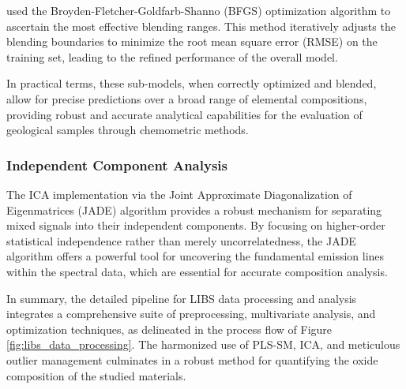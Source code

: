 \citet{andersonImprovedAccuracyQuantitative2017} used the Broyden-Fletcher-Goldfarb-Shanno (BFGS) optimization algorithm to ascertain the most effective blending ranges. This method iteratively adjusts the blending boundaries to minimize the root mean square error (RMSE) on the training set, leading to the refined performance of the overall model.

In practical terms, these sub-models, when correctly optimized and blended, allow for precise predictions over a broad range of elemental compositions, providing robust and accurate analytical capabilities for the evaluation of geological samples through chemometric methods.

\subsubsection{Independent Component Analysis}\label{sec:ica}

The ICA implementation via the Joint Approximate Diagonalization of Eigenmatrices (JADE) algorithm provides a robust mechanism for separating mixed signals into their independent components.
By focusing on higher-order statistical independence rather than merely uncorrelatedness, the JADE algorithm offers a powerful tool for uncovering the fundamental emission lines within the spectral data, which are essential for accurate composition analysis.

In summary, the detailed pipeline for LIBS data processing and analysis integrates a comprehensive suite of preprocessing, multivariate analysis, and optimization techniques, as delineated in the process flow of Figure \ref{fig:libs_data_processing}.
The harmonized use of PLS-SM, ICA, and meticulous outlier management culminates in a robust method for quantifying the oxide composition of the studied materials.